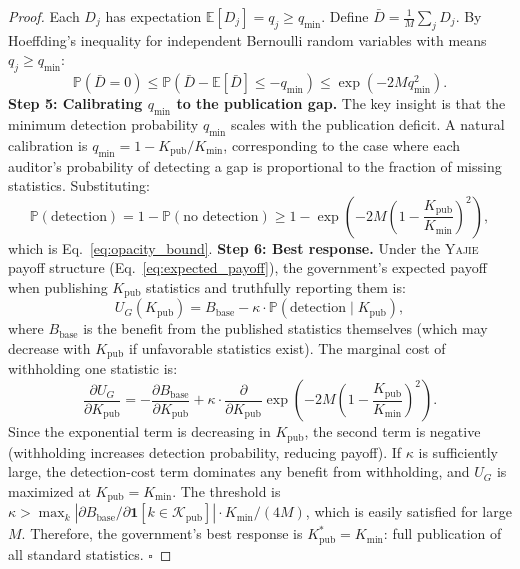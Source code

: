 \documentclass[11pt,a4paper]{article}
\theoremstyle{definition}
\newcommand{\Yajie}{\textsc{Yajie}}
\newcommand{\E}{\mathbb{E}}
\newcommand{\Pbb}{\mathbb{P}}
\newcommand{\ind}[1]{\mathbf{1}[#1]}
\begin{document}
\begin{proof}
Each $D_j$ has expectation $\E[D_j] = q_j \geq q_{\min}$. Define $\bar{D} = \frac{1}{M}\sum_j D_j$. By Hoeffding's inequality for independent Bernoulli random variables with means $q_j \geq q_{\min}$:
\begin{equation}
    \Pbb(\bar{D} = 0) \leq \Pbb(\bar{D} - \E[\bar{D}] \leq -q_{\min}) \leq \exp(-2M q_{\min}^2).
    \label{eq:hoeffding_D}
\end{equation}
\textbf{Step 5: Calibrating $q_{\min}$ to the publication gap.} The key insight is that the minimum detection probability $q_{\min}$ scales with the publication deficit. A natural calibration is $q_{\min} = 1 - K_{\mathrm{pub}} / K_{\min}$, corresponding to the case where each auditor's probability of detecting a gap is proportional to the fraction of missing statistics. Substituting:
\begin{equation}
    \Pbb(\text{detection}) = 1 - \Pbb(\text{no detection}) \geq 1 - \exp\left(-2M \left(1 - \frac{K_{\mathrm{pub}}}{K_{\min}}\right)^2\right),
    \label{eq:final_opacity_bound}
\end{equation}
which is Eq.~\eqref{eq:opacity_bound}.
\textbf{Step 6: Best response.} Under the \Yajie{} payoff structure (Eq.~\ref{eq:expected_payoff}), the government's expected payoff when publishing $K_{\mathrm{pub}}$ statistics and truthfully reporting them is:
\begin{equation}
    U_G(K_{\mathrm{pub}}) = B_{\mathrm{base}} - \kappa \cdot \Pbb(\text{detection} \mid K_{\mathrm{pub}}),
    \label{eq:U_K}
\end{equation}
where $B_{\mathrm{base}}$ is the benefit from the published statistics themselves (which may decrease with $K_{\mathrm{pub}}$ if unfavorable statistics exist). The marginal cost of withholding one statistic is:
\begin{equation}
    \frac{\partial U_G}{\partial K_{\mathrm{pub}}} = -\frac{\partial B_{\mathrm{base}}}{\partial K_{\mathrm{pub}}} + \kappa \cdot \frac{\partial}{\partial K_{\mathrm{pub}}} \exp\left(-2M\left(1 - \frac{K_{\mathrm{pub}}}{K_{\min}}\right)^2\right).
    \label{eq:marginal}
\end{equation}
Since the exponential term is decreasing in $K_{\mathrm{pub}}$, the second term is negative (withholding increases detection probability, reducing payoff). If $\kappa$ is sufficiently large, the detection-cost term dominates any benefit from withholding, and $U_G$ is maximized at $K_{\mathrm{pub}} = K_{\min}$. The threshold is $\kappa > \max_k |\partial B_{\mathrm{base}} / \partial \ind{k \in \mathcal{K}_{\mathrm{pub}}}| \cdot K_{\min} / (4M)$, which is easily satisfied for large $M$.
Therefore, the government's best response is $K_{\mathrm{pub}}^* = K_{\min}$: full publication of all standard statistics. $\square$
\end{proof}
\end{document}
